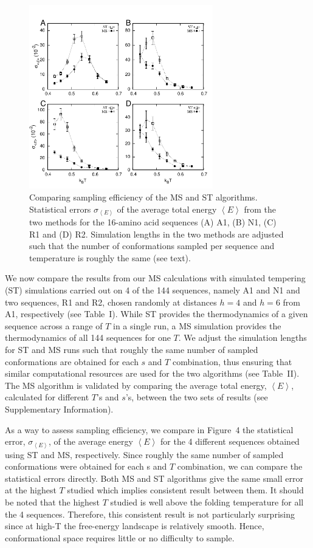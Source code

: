 \documentclass[
aip,
rsi,%
amsmath,amssymb,
reprint,%
]{revtex4-1}
\newcommand	 {\sbar}	{{s}}
\newcommand {\sigE}	{{\sigma_{\left < E \right >}}}
\begin{document}
\begin{figure}
\includegraphics[width=8.0cm]{Stderr}
\caption{Comparing sampling efficiency of the MS and ST algorithms. Statistical errors $\sigma_{\left < E\right >}$ of the average total energy $\left < E\right >$ from the two methods for the 16-amino acid sequences (A) A1, (B) N1, (C) R1 and (D) R2. Simulation lengths in the two methods are adjusted such that the number of conformations sampled per sequence and temperature is roughly the same (see text). }
\end{figure}

We now compare the results from our MS calculations with simulated tempering (ST) simulations carried out on 4 of the 144 sequences, namely A1 and N1 and two sequences, R1 and R2, chosen randomly at distances $h=4$ and $h=6$ from A1, respectively (see Table~I). While ST provides the thermodynamics of a given sequence across a range of $T$ in a single run, a MS simulation provides the thermodynamics of all 144 sequences for one $T$. We adjust the simulation lengths for ST and MS runs such that roughly the same number of sampled conformations are obtained for each $\sbar$ and $T$ combination, thus ensuring that similar computational resources are used for the two algorithms (see Table~II). The MS algorithm is validated by comparing the average total energy, $\left < E \right >$, calculated for different $T$'s and $\sbar$'s, between the two sets of results (see Supplementary Information). 

As a way to assess sampling efficiency, we compare in Figure~4 the statistical error, $\sigE$, of the average energy $\left <E\right >$ for the 4 different sequences obtained using ST and MS, respectively. Since roughly the same number of sampled conformations were obtained for each s and $T$ combination, we can compare the statistical errors directly. Both MS and ST algorithms give the same small error at the highest $T$ studied which implies consistent result between them. It should be noted that the highest $T$ studied is well above the folding temperature for all the 4 sequences. Therefore, this consistent result is not particularly surprising since at high-T the free-energy landscape is relatively smooth. Hence, conformational space requires little or no difficulty to sample.
\end{document}
